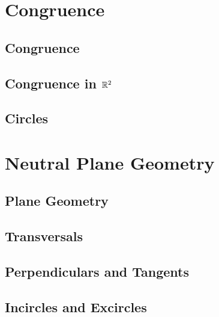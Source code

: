 \documentclass{memoir}
\begin{document}
\chapter{Congruence}
\newpage

  \section{Congruence}
    
    \newpage

  \section{Congruence in \(\mathbb{R}^2\)}
    
    \newpage

  \section{Circles}
    
    \newpage

\chapter{Neutral Plane Geometry}
\newpage

  \section{Plane Geometry}
    
    \newpage

  \section{Transversals}
    
    \newpage

  \section{Perpendiculars and Tangents}
    
    \newpage

  \section{Incircles and Excircles}
    

\backmatter
  \printindex
\end{document}
